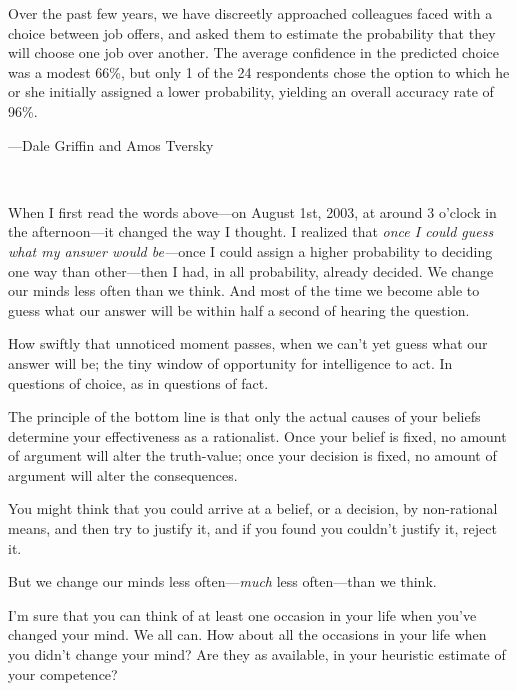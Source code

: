 \myendsectiontext


{
 Over the past few years, we have discreetly approached colleagues
faced with a choice between job offers, and asked them to estimate the
probability that they will choose one job over another. The average
confidence in the predicted choice was a modest 66\%, but only 1 of the
24 respondents chose the option to which he or she initially assigned a
lower probability, yielding an overall accuracy rate of 96\%.}

{\raggedleft
 {}---Dale Griffin and Amos Tversky
\par}


\bigskip

{
 ~}

{
 When I first read the words above---on August 1st, 2003, at around
3 o'clock in the afternoon---it changed the way I
thought. I realized that \textit{once I could guess what my answer
would be---}once I could assign a higher probability to deciding one
way than other---then I had, in all probability, already decided. We
change our minds less often than we think. And most of the time we
become able to guess what our answer will be within half a second of
hearing the question.}

{
 How swiftly that unnoticed moment passes, when we
can't yet guess what our answer will be; the tiny
window of opportunity for intelligence to act. In questions of choice,
as in questions of fact.}

{
 The principle of the bottom line is that only the actual causes of
your beliefs determine your effectiveness as a rationalist. Once your
belief is fixed, no amount of argument will alter the truth-value; once
your decision is fixed, no amount of argument will alter the
consequences.}

{
 You might think that you could arrive at a belief, or a decision,
by non-rational means, and then try to justify it, and if you found you
couldn't justify it, reject it.}

{
 But we change our minds less often---\textit{much} less
often---than we think.}

{
 I'm sure that you can think of at least one
occasion in your life when you've changed your mind. We
all can. How about all the occasions in your life when you
didn't change your mind? Are they as available, in your
heuristic estimate of your competence?}

